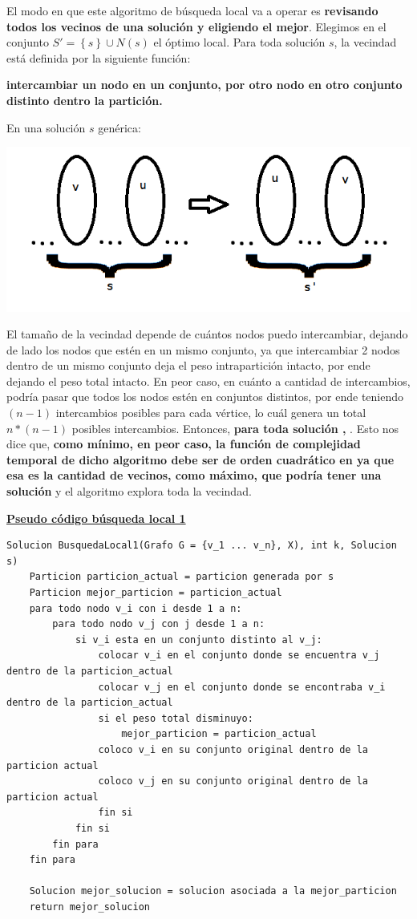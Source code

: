 \documentclass[10pt,a4paper]{article}
\begin{document}
El modo en que este algoritmo de búsqueda local va a operar es \textbf{revisando todos los vecinos de una solución y eligiendo el mejor}. Elegimos en el conjunto $S' = \left\{s\right\} \cup N(s)$ el óptimo local. Para toda solución $s$, la vecindad está definida por la siguiente función:

\textbf{ intercambiar un nodo  en un conjunto, por otro nodo  en otro conjunto distinto dentro la partición.}

En una solución $s$ genérica:

\includegraphics[scale=.75]{Vecindad1.png}

El tamaño de la vecindad depende de cuántos nodos puedo intercambiar, dejando de lado los nodos que estén en un mismo conjunto, ya que intercambiar 2 nodos dentro de un mismo conjunto deja el peso intrapartición intacto, por ende dejando el peso total intacto. En peor caso, en cuánto a cantidad de intercambios, podría pasar que todos los nodos estén en conjuntos distintos, por ende teniendo $(n-1)$ intercambios posibles para cada vértice, lo cuál genera un total $n*(n-1)$ posibles intercambios. Entonces, \textbf{para toda solución , }. Esto nos dice que, \textbf{como mínimo, en peor caso, la función de complejidad temporal de dicho algoritmo debe ser de orden cuadrático en  ya que esa es la cantidad de vecinos, como máximo, que podría tener una solución} y el algoritmo explora toda la vecindad.

\noindent \textbf{\underline{Pseudo código búsqueda local 1}}

\begin{lstlisting}
Solucion BusquedaLocal1(Grafo G = {v_1 ... v_n}, X), int k, Solucion s)
	Particion particion_actual = particion generada por s
	Particion mejor_particion = particion_actual
	para todo nodo v_i con i desde 1 a n:
		para todo nodo v_j con j desde 1 a n:
			si v_i esta en un conjunto distinto al v_j:
				colocar v_i en el conjunto donde se encuentra v_j dentro de la particion_actual
				colocar v_j en el conjunto donde se encontraba v_i dentro de la particion_actual
				si el peso total disminuyo:
					mejor_particion = particion_actual
				coloco v_i en su conjunto original dentro de la particion actual
				coloco v_j en su conjunto original dentro de la particion actual
				fin si
			fin si
		fin para
	fin para
	
	Solucion mejor_solucion = solucion asociada a la mejor_particion
	return mejor_solucion
\end{lstlisting}
\end{document}
